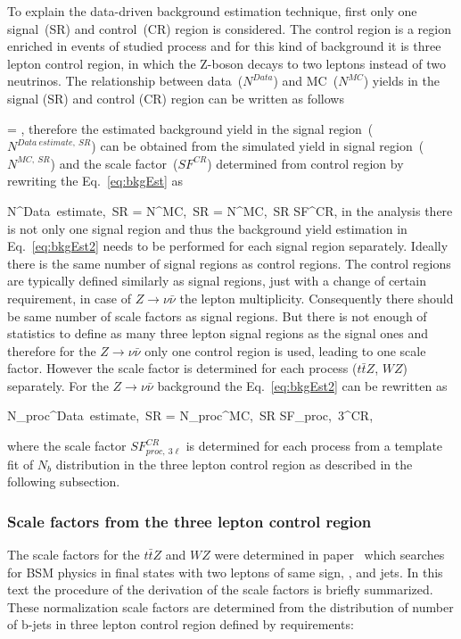 To explain the data-driven background estimation technique, first only one signal~(SR) and control~(CR) region is considered. The control region is a region enriched in events of studied process and for this kind of background it is three lepton control region, in which the Z-boson decays to two leptons instead of two neutrinos. The relationship between data~($N^{Data}$) and MC~($N^{MC}$) yields in the signal (SR) and control (CR) region can be written as follows

{
  = ,
}
therefore the estimated background yield in the signal region~($N^{Data~estimate,~SR}$) can be obtained from the simulated yield in signal region~($N^{MC,~SR}$) and the scale factor~($SF^{CR}$) determined from control region by rewriting the Eq.~\ref{eq:bkgEst} as

{
N^{Data~estimate,~SR}  = N^{MC,~SR} \times  {} = N^{MC,~SR} \times  SF^{CR},
}
in the analysis there is not only one signal region and thus the background yield estimation in Eq.~\ref{eq:bkgEst2} needs to be performed for each signal region separately. Ideally there is the same number of signal regions as control regions. The control regions are typically defined similarly as signal regions, just with a change of certain requirement, in case of $Z \to \nu \bar{\nu}$ the lepton multiplicity. Consequently there should be same number of scale factors as signal regions.  But there is not enough of statistics to define as many three lepton signal regions as the signal ones and therefore for the $Z \to \nu \bar{\nu}$ only one control region is used, leading to one scale factor. However the scale factor is determined for each process ($t\bar{t}Z$, $WZ$) separately. For the $Z \to \nu \bar{\nu}$ background the Eq.~\ref{eq:bkgEst2} can be rewritten as

{
N_{proc}^{Data~estimate,~SR}  = N_{proc}^{MC,~SR} \times SF_{proc,~3\ell}^{CR},
}

where the scale factor $SF_{proc,~3\ell}^{CR}$ is determined for each process from a template fit of $N_{b}$ distribution in the three lepton control region as described in the following subsection.

\subsubsection{Scale factors from the three lepton control region}

The scale factors for the $t\bar{t}Z$ and  $WZ$ were determined in paper~\cite{Sirunyan:2017uyt} which searches for BSM physics in final states with two leptons of same sign, \MET, and jets. In this text the procedure of the derivation of the scale factors is briefly summarized. These normalization scale factors are determined from the distribution of number of b-jets in three lepton control region defined by requirements:

